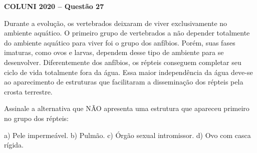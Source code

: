 \textbf{COLUNI 2020 -- Questão 27}\par\medskip Durante a evolução, os vertebrados deixaram de viver exclusivamente no ambiente aquático. O primeiro grupo de vertebrados a não depender totalmente do ambiente aquático para viver foi o grupo dos anfíbios. Porém, suas fases imaturas, como ovos e larvas, dependem desse tipo de ambiente para se desenvolver. Diferentemente dos anfíbios, os répteis conseguem completar seu ciclo de vida totalmente fora da água. Essa maior independência da água deve-se ao aparecimento de estruturas que facilitaram a disseminação dos répteis pela crosta terrestre.

\par

Assinale a alternativa que NÃO apresenta uma estrutura que apareceu primeiro no grupo dos répteis:

\par

a) Pele impermeável. b) Pulmão. c) Órgão sexual intromissor. d) Ovo com casca rígida.
